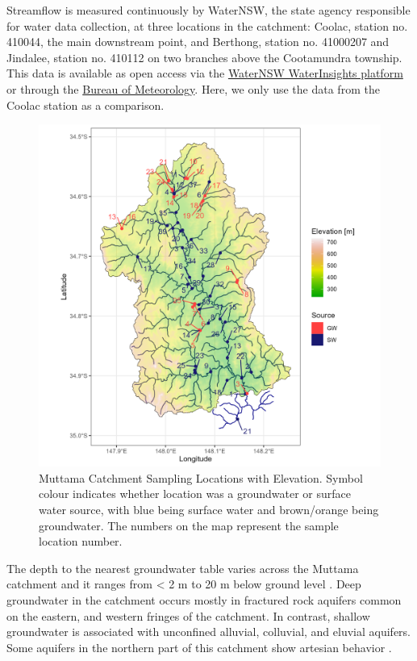 \documentclass[, manuscript]{copernicus}
\begin{document}
Streamflow is measured continuously by WaterNSW, the state agency
responsible for water data collection, at three locations in the
catchment: Coolac, station no. 410044, the main downstream point, and
Berthong, station no. 41000207 and Jindalee, station no. 410112 on two
branches above the Cootamundra township. This data is available as open
access via the \href{https://waterinsights.waternsw.com.au/}{WaterNSW
WaterInsights platform} or through the
\href{http://bom.gov.au/waterdata/}{Bureau of Meteorology}. Here, we
only use the data from the Coolac station as a comparison.

\begin{figure}
\includegraphics[width=0.8\linewidth]{Figures/gw_or_sw_map} \caption{Muttama Catchment Sampling Locations with Elevation. Symbol colour indicates whether location was a groundwater or surface water source, with blue being surface water and brown/orange being groundwater. The numbers on the map represent the sample location number.}\label{fig:samplemap}
\end{figure}

The depth to the nearest groundwater table varies across the Muttama
catchment and it ranges from \textless{} 2 m to 20 m below ground level
\citep{DECC2009}. Deep groundwater in the catchment occurs mostly in
fractured rock aquifers common on the eastern, and western fringes of
the catchment. In contrast, shallow groundwater is associated with
unconfined alluvial, colluvial, and eluvial aquifers. Some aquifers in
the northern part of this catchment show artesian behavior
\citep{Webb1999, Akter2018}.
\end{document}
